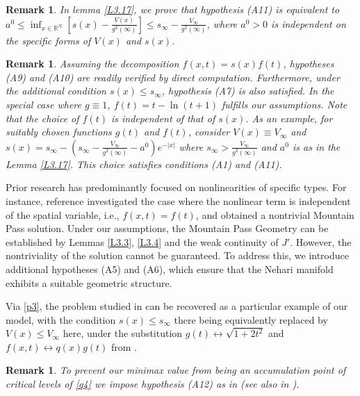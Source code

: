 \documentclass[10pt,a4paper]{amsart}
\numberwithin{equation}{section}
\newtheorem{remark}[theorem]{Remark}
\begin{document}
\begin{remark}\label{r3} \rm
In lemma \ref{L3.17}, we prove that hypothesis (A11) is equivalent to 
$a^0\leq\inf _{x\in{\mathbb{R}^N}}[s(x)-\frac{V(x)}{g^2(\infty)}]\leq s_{\infty}-\frac{V_{\infty}}{g^2(\infty)}$, 
where $a^0>0$ is independent on the specific forms of $V(x)$ and $s(x)$.
\end{remark}

\begin{remark}\label{r4} \rm 
Assuming the decomposition $f(x,t)=s(x)f(t)$, hypotheses (A9) and (A10) are readily verified by 
direct computation. Furthermore, under the additional condition $s(x)\leq s_\infty$, 
hypothesis (A7) is also satisfied. In the special case where $g\equiv1$,  $f(t)=t-\ln(t+1)$ 
fulfills our assumptions. Note that the choice of $f(t)$ is independent of that of $s(x)$. 
As an example, for suitably chosen functions $g(t)$ and $f(t)$, consider  $V(x)\equiv V_\infty$ 
and $s(x)=s_\infty-(s_\infty-\frac{V_\infty}{g^2(\infty)}-a^0)e^{-|x|}$ 
where $s_\infty>\frac{V_\infty}{g^2(\infty)}$ and $a^0$ is as in the Lemma \ref{L3.17}. 
This choice satisfies conditions (A1) and (A11). 
\end{remark}

Prior research has predominantly focused on nonlinearities of specific types. 
For instance, reference \cite{shen} investigated the case where the nonlinear term is independent 
of the spatial variable, i.e., $f(x,t)=f(t)$, and obtained  a nontrivial Mountain Pass solution.  
Under our assumptions,  the Mountain Pass Geometry can be established by Lemmas \ref{L3.3}, 
\ref{L3.4} and the weak continuity of $J'$. However, the nontriviality of the solution cannot be 
guaranteed. To address this, we introduce additional hypotheses (A5) and (A6), which ensure that the Nehari manifold exhibits a suitable geometric structure.

Via \eqref{p3}, the problem studied in \cite{fang3} can be recovered as a particular example of 
our model, with the condition $s(x)\leq s_\infty$ there being equivalently replaced by 
$V(x)\leq V_\infty$ here, under the  substitution $g(t)\longleftrightarrow \sqrt{1+2t^2}$ and 
$f(x,t)\longleftrightarrow q(x)g(t)$ from \cite{fang3}.

\begin{remark}\label{r5} \rm
To prevent our minimax value from being an accumulation point of critical levels of 
\eqref{q4} we impose hypothesis (A12) as in \cite{Ambrosetti} (see also in \cite{Carriao}). 
\end{remark}
\end{document}
